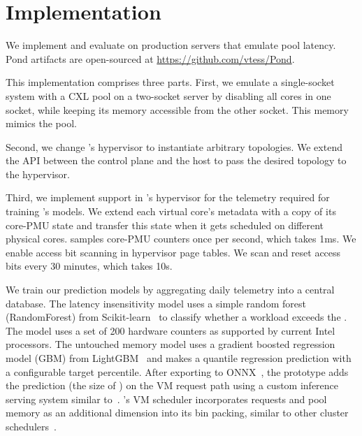 \section{Implementation}
\label{sec-impl}
We implement and evaluate \sys on production servers that emulate pool latency. Pond artifacts are open-sourced at \url{https://github.com/vtess/Pond}.

This implementation comprises three parts.
First, we emulate a single-socket system with a CXL pool on a two-socket server by disabling all cores in one socket, while keeping its memory accessible from the other socket. This memory mimics the pool.

Second, we change \azure's hypervisor to instantiate arbitrary \cvn topologies.
We extend the API between the control plane and the host to pass the desired \cvn topology to the hypervisor.

Third, we implement support in \azure's hypervisor for the telemetry required for training \sys's models.
We extend each virtual core's metadata with a copy of its core-PMU state and transfer this state when it gets scheduled on different physical cores.
\sys samples core-PMU counters once per second, which takes 1ms.
We enable access bit scanning in hypervisor page tables.
We scan and reset access bits every 30 minutes, which takes 10s.

We train our prediction models by aggregating daily telemetry into a central database.
The latency insensitivity model uses a simple random forest (RandomForest) from Scikit-learn~\cite{pedregosa2011scikit} to classify whether a
workload exceeds the \pdm.
The model uses a set of 200 hardware counters as supported by current Intel processors.
The untouched memory model uses a gradient boosted regression model (GBM) from LightGBM~\cite{ke2017lightgbm} and makes a quantile regression prediction with a configurable target percentile.
After exporting to ONNX~\cite{onnx}, the prototype adds the prediction (the size of \cvn) on the VM request path using a custom inference serving system similar to~\cite{olston2017tensorflow,crankshaw2017clipper,microsoft_trace_analysis}.
\azure's VM scheduler incorporates \cvn requests and pool memory as an additional dimension into its bin packing, similar to other cluster schedulers~\cite{hadary2020protean,burns2016borg,delimitrou2013paragon,delimitrou2015tarcil,schwarzkopf2013omega,verma2015large}.


